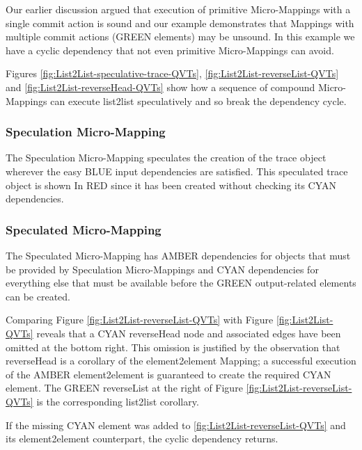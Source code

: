 \documentclass[conference]{IEEEtran}
\begin{document}
Our earlier discussion argued that execution of primitive Micro-Mappings with a single commit action is sound and our example demonstrates that Mappings with multiple commit actions (GREEN elements) may be unsound. In this example we have a cyclic dependency that not even primitive Micro-Mappings can avoid.

Figures \ref{fig:List2List-speculative-trace-QVTs}, \ref{fig:List2List-reverseList-QVTs} and \ref{fig:List2List-reverseHead-QVTs} show how a sequence of compound Micro-Mappings can execute list2list speculatively and so break the dependency cycle.

\subsubsection{Speculation Micro-Mapping}

The Speculation Micro-Mapping speculates the creation of the trace object wherever the easy BLUE input dependencies are satisfied. This speculated trace object is shown In RED since it has been created without checking its CYAN dependencies. %

\subsubsection{Speculated Micro-Mapping}

The Speculated Micro-Mapping has AMBER dependencies for objects that must be provided by Speculation Micro-Mappings and CYAN dependencies for everything else that must be available before the GREEN output-related elements can be created.

Comparing Figure \ref{fig:List2List-reverseList-QVTs} with Figure \ref{fig:List2List-QVTs} reveals that a CYAN reverseHead node and associated edges have been omitted at the bottom right. This omission is justified by the observation that reverseHead is a corollary of the element2element Mapping; a successful execution of the AMBER element2element is guaranteed to create the required CYAN element. The GREEN reverseList at the right of Figure \ref{fig:List2List-reverseList-QVTs} is the corresponding list2list corollary.

If the missing CYAN element was added to \ref{fig:List2List-reverseList-QVTs} and its element2element counterpart, the cyclic dependency returns.
\end{document}

